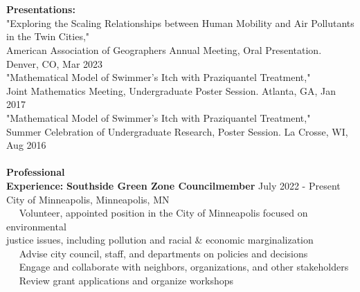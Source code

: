 \documentclass[letterpaper,12pt]{article}
\numberwithin{equation}{section}
\begin{document}
\\\\
\noindent\textbf{Presentations:}
\vspace*{.3cm} \\
"Exploring the Scaling Relationships between Human Mobility and Air Pollutants in the Twin Cities,"
\\ \indent American Association of Geographers Annual Meeting, Oral Presentation. Denver, CO, Mar 2023
\vspace*{.1cm} \\
"Mathematical Model of Swimmer's Itch with Praziquantel Treatment," 
\\ \indent Joint Mathematics Meeting, Undergraduate Poster Session. Atlanta, GA, Jan 2017
\vspace*{.1cm} \\
"Mathematical Model of Swimmer's Itch with Praziquantel Treatment,"
\\ \indent Summer Celebration of Undergraduate Research, Poster Session. La Crosse, WI, Aug 2016
\\\\
\noindent\textbf{Professional}\\
\noindent\textbf{Experience:} \hspace*{.16in} \textbf{Southside Green Zone Councilmember} \hspace*{1.68in} July 2022 - Present\\
\hspace*{1.2in} City of Minneapolis, Minneapolis, MN \vspace*{.1cm}\\
\hspace*{1.2in} \textbullet ~~ Volunteer, appointed position in the City of Minneapolis focused on environmental\\
\hspace*{1.6in} justice issues, including pollution and racial \& economic marginalization\\
\hspace*{1.2in} \textbullet ~~ Advise city council, staff, and departments on policies and decisions\\
\hspace*{1.2in} \textbullet ~~ Engage and collaborate with neighbors, organizations, and other stakeholders\\
\hspace*{1.2in} \textbullet ~~ Review grant applications and organize workshops\\
\\\\
\end{document}
